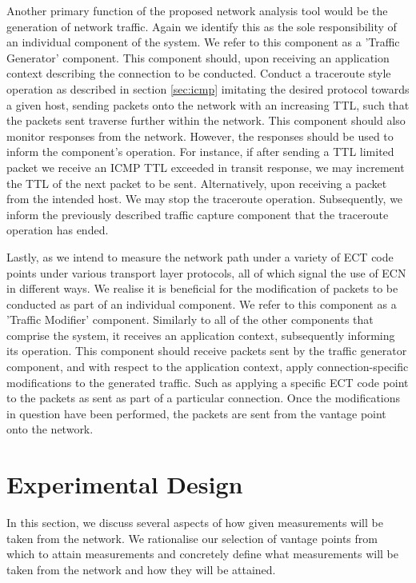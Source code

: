 \documentclass{l4proj}
\begin{document}
Another primary function of the proposed network analysis tool would be the generation of network traffic. Again we identify this as the sole responsibility of an individual component of the system. We refer to this component as a 'Traffic Generator' component. This component should, upon receiving an application context describing the connection to be conducted. Conduct a traceroute style operation as described in section \ref{sec:icmp} imitating the desired protocol towards a given host, sending packets onto the network with an increasing TTL, such that the packets sent traverse further within the network. This component should also monitor responses from the network. However, the responses should be used to inform the component's operation. For instance, if after sending a TTL limited packet we receive an ICMP TTL exceeded in transit response, we may increment the TTL of the next packet to be sent. Alternatively, upon receiving a packet from the intended host. We may stop the traceroute operation. Subsequently, we inform the previously described traffic capture component that the traceroute operation has ended.

Lastly, as we intend to measure the network path under a variety of ECT code points under various transport layer protocols, all of which signal the use of ECN in different ways. We realise it is beneficial for the modification of packets to be conducted as part of an individual component. We refer to this component as a 'Traffic Modifier' component. Similarly to all of the other components that comprise the system, it receives an application context, subsequently informing its operation. This component should receive packets sent by the traffic generator component, and with respect to the application context, apply connection-specific modifications to the generated traffic. Such as applying a specific ECT code point to the packets as sent as part of a particular connection. Once the modifications in question have been performed, the packets are sent from the vantage point onto the network.

\section{Experimental Design}
\label{sec:method}

In this section, we discuss several aspects of how given measurements will be taken from the network. We rationalise our selection of vantage points from which to attain measurements and concretely define what measurements will be taken from the network and how they will be attained.
\end{document}

